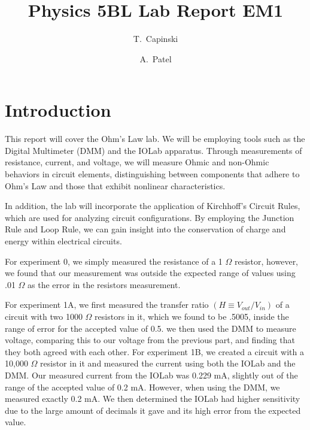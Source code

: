 \documentclass[11pt]{article}
\title{Physics 5BL Lab Report EM1}
\author{T.~Capinski \and A.~Patel}
\let\oldsection\section
\renewcommand\section{\clearpage\oldsection}
\begin{document}
    \maketitle
    \tableofcontents

    \section*{Introduction}\label{sec:introduction}

    This report will cover the Ohm's Law lab.
    We will be employing tools such as the Digital Multimeter (DMM) and the IOLab apparatus.
    Through measurements of resistance, current, and voltage, we will measure Ohmic and non-Ohmic behaviors in circuit elements, distinguishing between components that adhere to Ohm's Law and those that exhibit nonlinear characteristics.

    In addition, the lab will incorporate the application of Kirchhoff's Circuit Rules, which are used for analyzing circuit configurations.
    By employing the Junction Rule and Loop Rule, we can gain insight into the conservation of charge and energy within electrical circuits.

    For experiment 0, we simply measured the resistance of a 1 $\Omega$ resistor, however, we found that our measurement was outside the expected range of values using .01 $\Omega$ as the error in the resistors measurement. 

    For experiment 1A, we first measured the transfer ratio $(H \equiv V_{out} /V_{in})$ of a circuit with two 1000 $\Omega$ resistors in it, which we found to be .5005, inside the range of error for the accepted value of 0.5. we then used the DMM to measure voltage, comparing this to our voltage from the previous part, and finding that they both agreed with each other. For experiment 1B, we created a circuit with a 10,000 $\Omega$ resistor in it and measured the current using both the IOLab and the DMM. Our measured current from the IOLab was 0.229 mA, slightly out of the range of the accepted value of 0.2 mA. However, when using the DMM, we measured exactly 0.2 mA. We then determined the IOLab had higher sensitivity due to the large amount of decimals it gave and its high error from the expected value.
\end{document}
